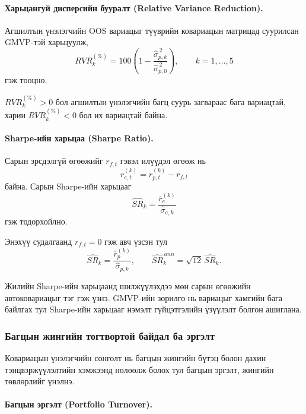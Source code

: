 \paragraph{Харьцангуй дисперсийн бууралт
	(Relative Variance Reduction).}

Агшилтын үнэлэгчийн OOS вариацыг
түүврийн ковариацын матрицад суурилсан
GMVP-тэй харьцуулж,
\[
RVR_k^{(\%)}
=
100\left(
1-
\frac{\widehat{\sigma}_{p,k}^{\,2}}
{\widehat{\sigma}_{p,0}^{\,2}}
\right),
\qquad k=1,\ldots,5
\]
гэж тооцно.

$RVR_k^{(\%)}>0$ бол агшилтын үнэлэгчийн
багц суурь загвараас бага вариацтай,
харин $RVR_k^{(\%)}<0$ бол их вариацтай
байна.

\paragraph{Sharpe-ийн харьцаа
	(Sharpe Ratio).}

Сарын эрсдэлгүй өгөөжийг $r_{f,t}$
гэвэл илүүдэл өгөөж нь
\[
r_{e,t}^{(k)}
=
r_{p,t}^{(k)}-r_{f,t}
\]
байна. Сарын Sharpe-ийн харьцааг
\[
\widehat{SR}_k
=
\frac{\overline{r}_e^{(k)}}
{\widehat{\sigma}_{e,k}}
\]
гэж тодорхойлно.

Энэхүү судалгаанд $r_{f,t}=0$
гэж авч үзсэн тул
\[
\widehat{SR}_k
=
\frac{\overline{r}_p^{(k)}}
{\widehat{\sigma}_{p,k}},
\qquad
\widehat{SR}_k^{\,ann}
=
\sqrt{12}\,\widehat{SR}_k.
\]

Жилийн Sharpe-ийн харьцаанд шилжүүлэхдээ
мөн сарын өгөөжийн автоковариацыг тэг
гэж үзнэ. GMVP-ийн зорилго нь вариацыг
хамгийн бага байлгах тул Sharpe-ийн
харьцааг нэмэлт гүйцэтгэлийн үзүүлэлт
болгон ашиглана.


\subsubsection{Багцын жингийн тогтвортой
	байдал ба эргэлт}
\label{subsubsec:weight_stability}

Ковариацын үнэлэгчийн сонголт нь
багцын жингийн бүтэц болон дахин
тэнцвэржүүлэлтийн хэмжээнд нөлөөлж
болох тул багцын эргэлт, жингийн
төвлөрлийг үнэлнэ.


\paragraph{Багцын эргэлт (Portfolio Turnover).}

